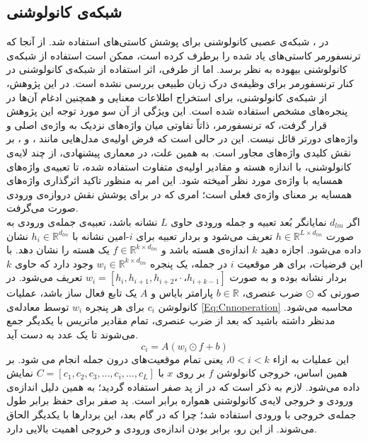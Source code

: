 \subsection{شبکه‌ی کانولوشنی}
در \cite{zhou:15clstm,Wang:18}، شبکه‌ی عصبی کانولوشنی برای پوشش کاستی‌های  استفاده شد. از آنجا که ترنسفورمر کاستی‌های یاد شده را برطرف کرده است، ممکن است استفاده از شبکه‌ی کانولوشنی بیهوده به نظر برسد. اما از طرفی، اثر استفاده از شبکه‌ی کانولوشنی در کنار ترنسفورمر برای وظیفه‌ی درک زبان طبیعی بررسی نشده است. در این پژوهش، از شبکه‌ی کانولوشنی، برای استخراج اطلاعات معنایی و همچنین ادغام آن‌ها در پنجره‌های مشخص استفاده شده است. این ویژگی از آن سو مورد توجه این پژوهش قرار گرفت، که ترنسفورمر، ذاتاً تفاوتی میان واژه‌های نزدیک به واژه‌ی اصلی و واژه‌های دورتر قائل نیست. این در حالی است که فرض اولیه‌ی مدل‌هایی مانند  \cite{ngram}،  و ، بر نقش کلیدی واژه‌های مجاور است. به همین علت، در معماری پیشنهادی، از چند لایه‌ی کانولوشنی، با اندازه هسته و مقادیر اولیه‌ی متفاوت استفاده شده، تا تعبیه‌ی واژه‌های همسایه با واژه‌ی مورد نظر آمیخته شود. این امر به منظور تاکید اثرگذاری واژه‌های همسایه بر معنای واژه‌ی فعلی است؛ امری که در  برای پوشش نقش دروازه‌ی ورودی صورت می‌گرفت.\\
اگر $d_{lm}$ نمایانگر بُعد تعبیه و جمله ورودی حاوی $L$ نشانه باشد، تعبیه‌ی جمله‌ی ورودی به صورت $h\in\mathbb{R}^{L\times d_{lm}}$ تعریف می‌شود و بردار تعبیه برای $i$-امین نشانه با $h_{i}\in \mathbb{R}^{d_{lm}}$ نشان داده می‌شود. اجازه دهید $k$ اندازه‌ی هسته باشد و $f\in\mathbb{R}^{k\times d_{lm}}$ یک هسته را نشان دهد. با این فرضیات، برای هر موقعیت $i$ در جمله، یک پنجره
 $w_{i}\in\mathbb{R}^{k\times d_{lm}}$
  وجود دارد که حاوی $k$ بردار نشانه بوده و به صورت $w_{i}=\left[h_{i},h_{i+1},h_{i+2}،\cdot،h_{i+k-1}\right]$ تعریف می‌شود. در صورتی که 
$\odot$
 ضرب عنصری، $b\in\mathbb{R}$ پارامتر بایاس و $A$ یک تابع فعال ساز باشد، عملیات کانولوشن $c_{i}$ برای هر پنجره $w_{i}$ توسط معادله‌ی \ref{Eq:Cnnoperation} محاسبه می‌شود. مدنظر داشته باشید که بعد از ضرب عنصری، تمام مقادیر ماتریس با یکدیگر جمع می‌شوند تا یک عدد به دست آید.
 \begin{equation}
 	c_{i}=A\left(w_{i}\odot f+b\right)
 	\label{Eq:Cnnoperation} 
 \end{equation}
این عملیات به ازاء $0<i<k$، یعنی تمام موقعیت‌های درون جمله انجام می شود. بر همین اساس، خروجی کانولوشن $f$ بر روی $x$ با $C=\left[c_{1},c_{2},c_{3},...,c_{i},...,c_{L}\right]$ نمایش داده می‌شود. لازم به ذکر است که در  از پد صفر استفاده گردید؛ به همین دلیل اندازه‌ی ورودی و خروجی لایه‌ی کانولوشنی همواره برابر است. پد صفر برای حفظ برابر طول جمله‌ی خروجی با ورودی استفاده شد؛ چرا که در گام بعد، این بردارها با یکدیگر الحاق می‌شوند. از این رو، برابر بودن اندازه‌ی ورودی و خروجی اهمیت بالایی دارد.
